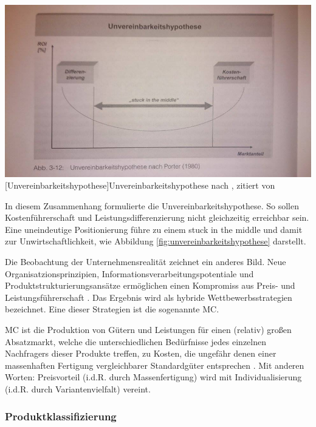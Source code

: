\documentclass[12pt,a4paper,bibliography=totocnumbered,listof=totoc]{scrartcl}
\begin{document}
\vspace{1em}
\begin{minipage}{\linewidth}
	\centering
	\includegraphics[width=0.7\linewidth]{Abbildungen/unvereinbarkeitshypothese.jpg}
	[Unvereinbarkeitshypothese]{Unvereinbarkeitshypothese nach \cite{porter80}, zitiert von \cite{schuh05}}
	\label{fig:unvereinbarkeitshypothese}
\end{minipage}
\vspace{1em}

In diesem Zusammenhang formulierte \citeauthor{porter80} die Unvereinbarkeitshypothese. So sollen Kostenführerschaft und Leistungsdifferenzierung nicht gleichzeitig erreichbar sein. Eine uneindeutige Positionierung führe zu einem \glqq stuck in the middle\grqq{} und damit zur Unwirtschaftlichkeit, wie Abbildung \ref{fig:unvereinbarkeitshypothese} darstellt.

Die Beobachtung der Unternehmensrealität zeichnet ein anderes Bild. Neue Organisatzionsprinzipien, Informationsverarbeitungspotentiale und Produktstrukturierungsansätze ermöglichen einen Kompromiss aus Preis- und Leistungsführerschaft \citep{schuh05}. Das Ergebnis wird als hybride Wettbewerbsstrategien bezeichnet. Eine dieser Strategien ist die sogenannte \ac{MC}.

\ac{MC} ist die \glqq Produktion von Gütern und Leistungen für einen (relativ) großen Absatzmarkt, welche die unterschiedlichen Bedürfnisse jedes einzelnen Nachfragers dieser Produkte treffen, zu Kosten, die ungefähr denen einer massenhaften Fertigung vergleichbarer Standardgüter entsprechen\grqq{} \citep{piller98}. Mit anderen Worten: Preisvorteil (i.d.R. durch Massenfertigung) wird mit Individualisierung (i.d.R. durch Variantenvielfalt) vereint.

\subsubsection{Produktklassifizierung}
 \label{subssubsection:Produktklassifizierung}
\end{document}
